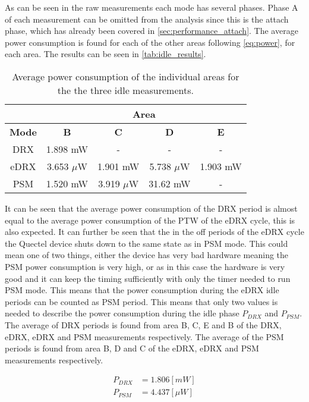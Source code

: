 As can be seen in the raw measurements each mode has several phases. Phase A of each measurement can be omitted from the analysis since this is the attach phase, which has already been covered in \autoref{sec:performance_attach}. The average power consumption is found for each of the other areas following \autoref{eq:power}, for each area. The results can be seen in \autoref{tab:idle_results}.

\begin{table}[H]
\centering
\begin{tabular}{|c|c|c|c|c|} 
\multicolumn{1}{c}{ }	& \multicolumn{4}{c}{Area} \\ \hline
\textbf{Mode}	& \textbf{B}	& \textbf{C} 	& \textbf{D} 	& \textbf{E} \\ \hline
DRX				& 1.898 mW		& - 			& - 			& - \\ \hline
eDRX			& 3.653 $\mu$W	& 1.901 mW		& 5.738 $\mu$W	& 1.903 mW \\ \hline
PSM 			& 1.520 mW		& 3.919 $\mu$W	& 31.62 mW		& - \\ \hline 
\end{tabular}
\caption{Average power consumption of the individual areas for the the three idle measurements.}
\label{tab:idle_results}
\end{table}

It can be seen that the average power consumption of the DRX period is almost equal to the average power consumption of the PTW of the eDRX cycle, this is also expected. It can further be seen that the in the off periods of the eDRX cycle the Quectel device shuts down to the same state as in PSM mode. This could  mean one of two things, either the device has very bad hardware meaning the PSM power consumption is very high, or as in this case the hardware is very good and it can keep the timing sufficiently with only the timer needed to run PSM mode. This means that the power consumption during the eDRX idle periods can be counted as PSM period. This means that only two values is needed to describe the power consumption during the idle phase $P_{DRX}$ and $P_{PSM}$. The average of DRX periods is found from area B, C, E and B of the DRX, eDRX, eDRX and PSM measurements respectively. The average of the PSM periods is found from area B, D and C of the eDRX, eDRX and PSM measurements respectively.

\begin{align}
P_{DRX} &= 1.806 [mW] \\
P_{PSM} &= 4.437 [\mu W]
\end{align}


